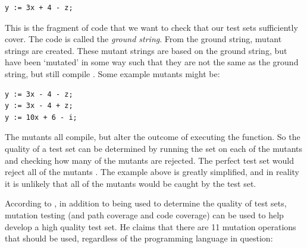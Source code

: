 \begin{lstlisting}
y := 3x + 4 - z;
\end{lstlisting}

This is the fragment of code that we want to check that our test sets sufficiently cover. The code is called the \emph{ground string}. From the ground string, mutant strings are created. These mutant strings are based on the ground string, but have been `mutated' in some way such that they are not the same as the ground string, but still compile \citep{softwareTestingIntro}. Some example mutants might be:

\begin{lstlisting}
y := 3x - 4 - z;
y := 3x - 4 + z;
y := 10x + 6 - i;
\end{lstlisting}

The mutants all compile, but alter the outcome of executing the function. So the quality of a test set can be determined by running the set on each of the mutants and checking how many of the mutants are rejected. The perfect test set would reject all of the mutants \citep{softwareTestingIntro}. The example above is greatly simplified, and in reality it is unlikely that all of the mutants would be caught by the test set.

According to \citet{softwareTestingIntro}, in addition to being used to determine the quality of test sets, mutation testing (and path coverage and code coverage) can be used to help develop a high quality test set. He claims that there are 11 mutation operations that should be used, regardless of the programming language in question:

